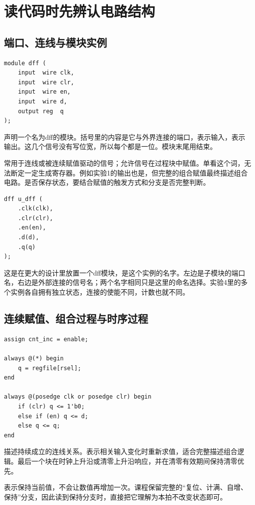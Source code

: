 \clearpage\section{读代码时先辨认电路结构}
\subsection{端口、连线与模块实例}
\begin{lstlisting}
module dff (
    input  wire clk,
    input  wire clr,
    input  wire en,
    input  wire d,
    output reg  q
);
\end{lstlisting}
声明一个名为dff的模块。括号里的内容是它与外界连接的端口，表示输入，表示输出。这几个信号没有写位宽，所以每个都是一位。模块末尾用结束。

常用于连线或被连续赋值驱动的信号；允许信号在过程块中赋值。单看这个词，无法断定一定生成寄存器。例如实验1的输出也是，但完整的组合赋值最终描述组合电路。是否保存状态，要结合赋值的触发方式和分支是否完整判断。

\begin{lstlisting}
dff u_dff (
    .clk(clk),
    .clr(clr),
    .en(en),
    .d(d),
    .q(q)
);
\end{lstlisting}
这是在更大的设计里放置一个dff模块，是这个实例的名字。左边是子模块的端口名，右边是外部连接的信号名；两个名字相同只是这里的命名选择。实验4里的多个实例各自拥有独立状态，连接的使能不同，计数也就不同。

\subsection{连续赋值、组合过程与时序过程}
\begin{lstlisting}
assign cnt_inc = enable;

always @(*) begin
    q = regfile[rsel];
end

always @(posedge clk or posedge clr) begin
    if (clr) q <= 1'b0;
    else if (en) q <= d;
    else q <= q;
end
\end{lstlisting}
描述持续成立的连线关系。表示相关输入变化时重新求值，适合完整描述组合逻辑。最后一个块在时钟上升沿或清零上升沿响应，并在清零有效期间保持清零优先。

表示保持当前值，不会让数值再增加一次。课程保留完整的“复位、计满、自增、保持”分支，因此读到保持分支时，直接把它理解为本拍不改变状态即可。

